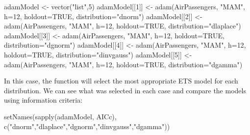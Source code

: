 \documentclass[
]{book}
\newenvironment{Shaded}{\begin{snugshade}}{\end{snugshade}}
\newcommand{\AttributeTok}[1]{\textcolor[rgb]{0.77,0.63,0.00}{#1}}
\newcommand{\ConstantTok}[1]{\textcolor[rgb]{0.00,0.00,0.00}{#1}}
\newcommand{\DecValTok}[1]{\textcolor[rgb]{0.00,0.00,0.81}{#1}}
\newcommand{\FunctionTok}[1]{\textcolor[rgb]{0.00,0.00,0.00}{#1}}
\newcommand{\NormalTok}[1]{#1}
\newcommand{\OtherTok}[1]{\textcolor[rgb]{0.56,0.35,0.01}{#1}}
\newcommand{\StringTok}[1]{\textcolor[rgb]{0.31,0.60,0.02}{#1}}
\theoremstyle{definition}
\theoremstyle{definition}
\theoremstyle{definition}
\theoremstyle{definition}
\theoremstyle{remark}
\begin{document}
\begin{Shaded}
\begin{Highlighting}[]
\NormalTok{adamModel }\OtherTok{\textless{}{-}} \FunctionTok{vector}\NormalTok{(}\StringTok{"list"}\NormalTok{,}\DecValTok{5}\NormalTok{)}
\NormalTok{adamModel[[}\DecValTok{1}\NormalTok{]] }\OtherTok{\textless{}{-}} \FunctionTok{adam}\NormalTok{(AirPassengers, }\StringTok{"MAM"}\NormalTok{, }\AttributeTok{h=}\DecValTok{12}\NormalTok{, }\AttributeTok{holdout=}\ConstantTok{TRUE}\NormalTok{,}
                       \AttributeTok{distribution=}\StringTok{"dnorm"}\NormalTok{)}
\NormalTok{adamModel[[}\DecValTok{2}\NormalTok{]] }\OtherTok{\textless{}{-}} \FunctionTok{adam}\NormalTok{(AirPassengers, }\StringTok{"MAM"}\NormalTok{, }\AttributeTok{h=}\DecValTok{12}\NormalTok{, }\AttributeTok{holdout=}\ConstantTok{TRUE}\NormalTok{,}
                       \AttributeTok{distribution=}\StringTok{"dlaplace"}\NormalTok{)}
\NormalTok{adamModel[[}\DecValTok{3}\NormalTok{]] }\OtherTok{\textless{}{-}} \FunctionTok{adam}\NormalTok{(AirPassengers, }\StringTok{"MAM"}\NormalTok{, }\AttributeTok{h=}\DecValTok{12}\NormalTok{, }\AttributeTok{holdout=}\ConstantTok{TRUE}\NormalTok{,}
                       \AttributeTok{distribution=}\StringTok{"dgnorm"}\NormalTok{)}
\NormalTok{adamModel[[}\DecValTok{4}\NormalTok{]] }\OtherTok{\textless{}{-}} \FunctionTok{adam}\NormalTok{(AirPassengers, }\StringTok{"MAM"}\NormalTok{, }\AttributeTok{h=}\DecValTok{12}\NormalTok{, }\AttributeTok{holdout=}\ConstantTok{TRUE}\NormalTok{,}
                       \AttributeTok{distribution=}\StringTok{"dinvgauss"}\NormalTok{)}
\NormalTok{adamModel[[}\DecValTok{5}\NormalTok{]] }\OtherTok{\textless{}{-}} \FunctionTok{adam}\NormalTok{(AirPassengers, }\StringTok{"MAM"}\NormalTok{, }\AttributeTok{h=}\DecValTok{12}\NormalTok{, }\AttributeTok{holdout=}\ConstantTok{TRUE}\NormalTok{,}
                       \AttributeTok{distribution=}\StringTok{"dgamma"}\NormalTok{)}
\end{Highlighting}
\end{Shaded}

In this case, the function will select the most appropriate ETS model for each distribution. We can see what was selected in each case and compare the models using information criteria:

\begin{Shaded}
\begin{Highlighting}[]
\FunctionTok{setNames}\NormalTok{(}\FunctionTok{sapply}\NormalTok{(adamModel, AICc),}
         \FunctionTok{c}\NormalTok{(}\StringTok{"dnorm"}\NormalTok{,}\StringTok{"dlaplace"}\NormalTok{,}\StringTok{"dgnorm"}\NormalTok{,}\StringTok{"dinvgauss"}\NormalTok{,}\StringTok{"dgamma"}\NormalTok{))}
\end{Highlighting}
\end{Shaded}
\end{document}
